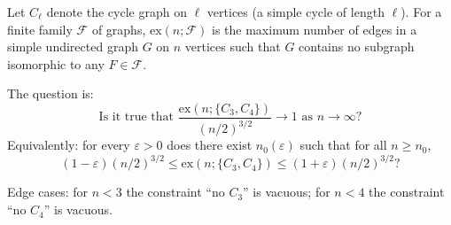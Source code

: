 Let $C_\ell$ denote the cycle graph on $\ell$ vertices (a simple cycle of length $\ell$).  
For a finite family $\mathcal{F}$ of graphs, $\mathrm{ex}(n;\mathcal{F})$ is the maximum number of edges in a simple undirected graph $G$ on $n$ vertices such that $G$ contains no subgraph isomorphic to any $F\in\mathcal{F}$.

The question is:
\[
\text{Is it true that }\frac{\mathrm{ex}(n;\{C_3,C_4\})}{(n/2)^{3/2}}\to 1\text{ as }n\to\infty? 
\]
Equivalently: for every $\varepsilon>0$ does there exist $n_0(\varepsilon)$ such that for all $n\ge n_0$,
\[
(1-\varepsilon)(n/2)^{3/2}\le \mathrm{ex}(n;\{C_3,C_4\})\le (1+\varepsilon)(n/2)^{3/2}?
\]

Edge cases: for $n<3$ the constraint ``no $C_3$'' is vacuous; for $n<4$ the constraint ``no $C_4$'' is vacuous.
